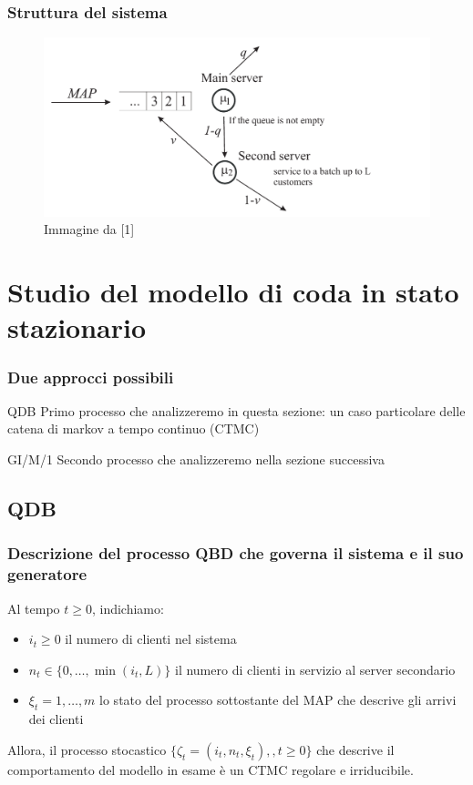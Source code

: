 \documentclass{beamer}
\begin{document}
\begin{frame}
    \frametitle{Struttura del sistema}
    \begin{figure}[h]
        \centering
        \includegraphics[width=\textwidth]{hVQg024.png}
        \caption{Immagine da [1]}
        \label{fig:diagramma_di_stato}
    \end{figure}
\end{frame}

\section{Studio del modello di coda in stato stazionario}

\begin{frame}
    \frametitle{Due approcci possibili}

    \begin{block}{QDB}
        Primo processo che analizzeremo in  questa sezione: un caso particolare delle catena di markov a tempo continuo (CTMC)
    \end{block}

    \begin{block}{GI/M/1}
        Secondo processo che analizzeremo nella sezione successiva
    \end{block}

\end{frame}

\subsection{QDB}

\begin{frame}
    \frametitle{Descrizione del processo QBD che governa il sistema e il suo generatore}
    Al tempo $t\geq 0$, indichiamo:
    \begin{itemize}
        \item $i_t\geq 0$ il numero di clienti nel sistema
        \item $n_t\in\{0,\ldots,\min(i_t,L)\}$ il numero di clienti in servizio al server secondario
        \item $\xi_t=1,\ldots,m$ lo stato del processo sottostante del MAP che descrive gli arrivi dei clienti
    \end{itemize}
    \begin{block}{}
        Allora, il processo stocastico $\{\zeta_t=(i_t,n_t,\xi_t),,t\geq 0\}$ che descrive il comportamento del modello in esame è un CTMC regolare e irriducibile.
    \end{block}
\end{frame}
\end{document}
